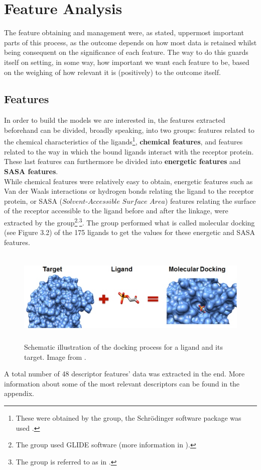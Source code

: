 \section{Feature Analysis}
The feature obtaining and management were, as stated, uppermost important parts of this process, as the outcome depends on how  most data is retained whilst being consequent on the significance of each feature. The way to do this guards itself on setting, in some way, how important we want each feature to be, based on the weighing of how relevant it is (positively) to the outcome itself. 

\subsection{Features}
In order to build the models we are interested in, the features extracted beforehand can be divided, broadly speaking, into two groups: features related to the chemical characteristics of the ligands\footnote{These were obtained by the group, the Schrödinger software package was used \cite{maestro}.}, \textbf{chemical features}, and features related to the way in which the bound ligands interact with the receptor protein. These last features can furthermore be divided into \textbf{energetic features} and \textbf{SASA features}.\\

While chemical features were relatively easy to obtain, energetic features such as Van der Waals interactions or hydrogen bonds relating the ligand to the receptor protein, or SASA ($Solvent$-$Accessible$ $Surface$ $Area$) features relating the surface of the receptor accessible to the ligand before and after the linkage, were extracted by the group\footnote{The group used GLIDE software (more information in \cite{glide}).}$^,$\footnote{The group is referred to as in \cite{group}.}. The group performed what is called molecular docking (see Figure 3.2) of the 175 ligands to get the values for these energetic and SASA features. 

\begin{center}
    \begin{figure}[h]
    \includegraphics[width=15cm, height=4.5cm]{Images/Results/docking_image.jpg}
    \caption{Schematic illustration of the docking process for a ligand and its target. Image from \cite{docking_figure}.}
    \vspace{-10pt}
    \end{figure}
\end{center}
A total number of 48 descriptor features' data was extracted in the end. More information about some of the most relevant descriptors can be found in the appendix.

